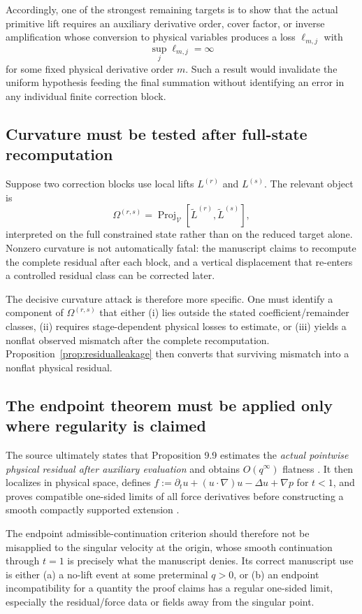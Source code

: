 \documentclass[12pt]{article}
\newcommand{\Proj}{\operatorname{Proj}}
\newcommand{\Vv}{\mathcal V}
\begin{document}
Accordingly, one of the strongest remaining targets is to show that the actual primitive lift requires an auxiliary derivative order, cover factor, or inverse amplification whose conversion to physical variables produces a loss $\ell_{m,j}$ with
\[
\sup_j\ell_{m,j}=\infty
\]
for some fixed physical derivative order $m$. Such a result would invalidate the uniform hypothesis feeding the final summation without identifying an error in any individual finite correction block.

\subsection{Curvature must be tested after full-state recomputation}
Suppose two correction blocks use local lifts $L^{(r)}$ and $L^{(s)}$. The relevant object is
\[
\Omega^{(r,s)}
=\Proj_{\Vv}[\widetilde L^{(r)},\widetilde L^{(s)}],
\]
interpreted on the full constrained state rather than on the reduced target alone. Nonzero curvature is not automatically fatal: the manuscript claims to recompute the complete residual after each block, and a vertical displacement that re-enters a controlled residual class can be corrected later.

The decisive curvature attack is therefore more specific. One must identify a component of $\Omega^{(r,s)}$ that either (i) lies outside the stated coefficient/remainder classes, (ii) requires stage-dependent physical losses to estimate, or (iii) yields a nonflat observed mismatch after the complete recomputation. Proposition~\ref{prop:residualleakage} then converts that surviving mismatch into a nonflat physical residual.

\subsection{The endpoint theorem must be applied only where regularity is claimed}
The source ultimately states that Proposition 9.9 estimates the \emph{actual pointwise physical residual after auxiliary evaluation} and obtains $O(q^\infty)$ flatness \cite[pp. 113--116]{OpenAI2026}. It then localizes in physical space, defines $f:=\partial_tu+(u\cdot\nabla)u-\Delta u+\nabla p$ for $t<1$, and proves compatible one-sided limits of all force derivatives before constructing a smooth compactly supported extension \cite[Sec. 10.2]{OpenAI2026}.

The endpoint admissible-continuation criterion should therefore not be misapplied to the singular velocity at the origin, whose smooth continuation through $t=1$ is precisely what the manuscript denies. Its correct manuscript use is either (a) a no-lift event at some preterminal $q>0$, or (b) an endpoint incompatibility for a quantity the proof claims has a regular one-sided limit, especially the residual/force data or fields away from the singular point.
\end{document}

